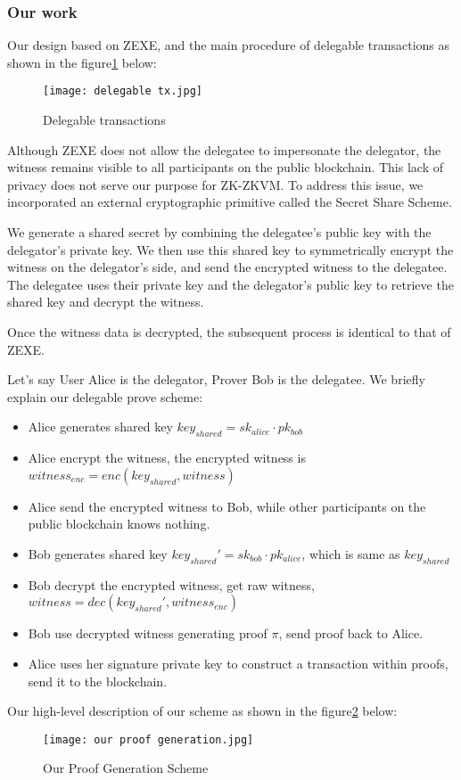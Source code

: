 \subsubsection{Our work}

Our design based on ZEXE, and the main procedure of delegable transactions as shown in the figure\ref{fig:delegable_tx} below:

\begin{figure}[!ht]
    \centering
    \texttt{[image: delegable tx.jpg]}
    \caption{Delegable transactions}
    \label{fig:delegable_tx}
\end{figure}

Although ZEXE does not allow the delegatee to impersonate the delegator, the witness remains visible to all participants on the public blockchain. This lack of privacy does not serve our purpose for ZK-ZKVM. To address this issue, we incorporated an external cryptographic primitive called the Secret Share Scheme.

We generate a shared secret by combining the delegatee's public key with the delegator's private key. We then use this shared key to symmetrically encrypt the witness on the delegator's side, and send the encrypted witness to the delegatee. The delegatee uses their private key and the delegator's public key to retrieve the shared key and decrypt the witness.

Once the witness data is decrypted, the subsequent process is identical to that of ZEXE.

Let's say User Alice is the delegator, Prover Bob is the delegatee. We briefly explain our delegable prove scheme:
\color{blue!50!black}
\begin{itemize}
    \item Alice generates shared key $key_{shared} = sk_{alice} \cdot pk_{bob}$
    \item Alice encrypt the witness, the encrypted witness is $witness_{enc} = enc(key_{shared}, witness)$
    \item Alice send the encrypted witness to Bob, while other participants on the public blockchain knows nothing.
    \item Bob generates shared key $key_{shared}' = sk_{bob} \cdot pk_{alice}$, which is same as $key_{shared}$
    \item Bob decrypt the encrypted witness, get raw witness, $witness = dec(key_{shared}', witness_{enc})$
    \item Bob use decrypted witness generating proof $\pi$, send proof back to Alice.
    \item Alice uses her signature private key to construct a transaction within proofs, send it to the blockchain.
\end{itemize}
\normalcolor{}

Our high-level description of our scheme as shown in the figure\ref{fig:our_proof_generation} below:
\begin{figure}[!ht]
    \centering
    \texttt{[image: our proof generation.jpg]}
    \caption{Our Proof Generation Scheme}
    \label{fig:our_proof_generation}
\end{figure} 
